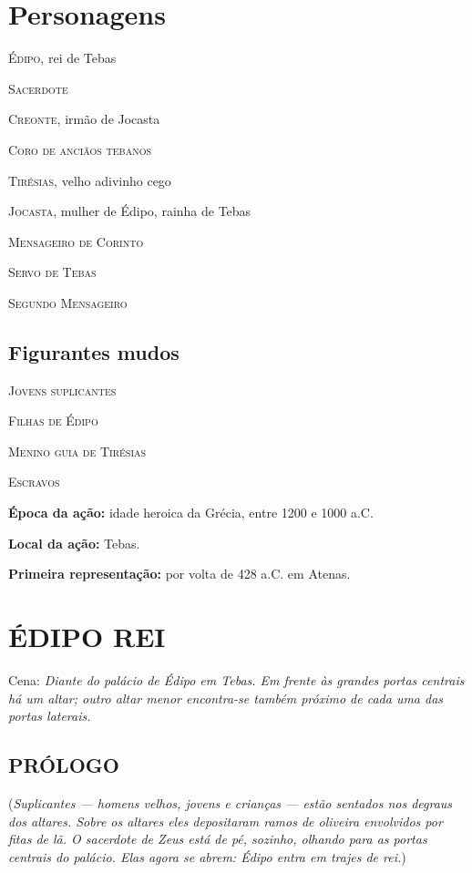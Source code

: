 
\chapter{Personagens}

\textsc{Édipo,} rei de Tebas

\textsc{Sacerdote}

\textsc{Creonte,} irmão de Jocasta

\textsc{Coro de anciãos tebanos}

\textsc{Tirésias,} velho adivinho cego

\textsc{Jocasta,} mulher de Édipo, rainha de Tebas

\textsc{Mensageiro de Corinto}

\textsc{Servo de Tebas}

\textsc{Segundo Mensageiro}


\section{Figurantes mudos} 

\textsc{Jovens suplicantes} 

\textsc{Filhas de Édipo}

\textsc{Menino guia de Tirésias}

\textsc{Escravos}

\textbf{Época da ação:} idade heroica da Grécia, entre 1200 e 1000 a.C.

\textbf{Local da ação:} Tebas.

\textbf{Primeira representação:} por volta de 428 a.C. em Atenas.


\clearpage

\chapter{ÉDIPO REI}

Cena: \emph{Diante do palácio de Édipo em Tebas. Em frente às grandes
portas centrais há um altar; outro altar menor encontra-se também
próximo de cada uma das portas laterais.}

\section{PRÓLOGO}

(\emph{Suplicantes --- homens velhos, jovens e crianças --- estão sentados
nos degraus dos altares. Sobre os altares eles depositaram ramos de
oliveira envolvidos por fitas de lã. O sacerdote de Zeus está de pé,
sozinho, olhando para as portas centrais do palácio. Elas agora se
abrem: Édipo entra em trajes de rei.})

